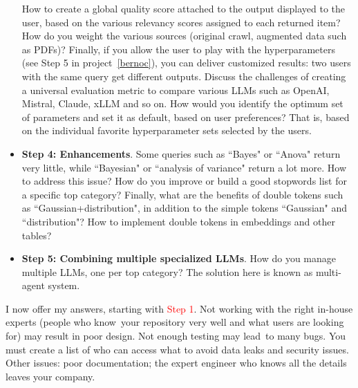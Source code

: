 \documentclass[oneside,10pt]{book}
\begin{document}
\begin{itemize}
How to create a global quality score attached to the output displayed to the user, based on the various relevancy scores assigned to each returned item? How do you weight the various sources (original crawl, augmented data such as PDFs)? Finally, if you allow the user to play with the 
\textcolor{index}{hyperparameters} (see Step 5 
 in project~\ref{bernoc}), you can deliver customized results: two users with the same query get different outputs. Discuss the challenges of creating
 a universal evaluation metric to compare various LLMs such as OpenAI, Mistral, Claude, xLLM and so on. How would you identify the optimum set of parameters and set it as default, based on user preferences? That is, based on the individual favorite hyperparameter sets selected by the users. 
\vspace{1ex}
\item[] {\bf Step 4: Enhancements}.  Some queries such as ``Bayes" or ``Anova" return very little, while ``Bayesian" or ``analysis of variance" return a lot more. How to address this issue? How do you improve or build a good stopwords list for a specific top category? Finally, what are the benefits of double tokens such as ``Gaussian+distribution", in addition to the simple tokens ``Gaussian" and ``distribution"? How to implement double tokens in embeddings and other tables?
\vspace{1ex}
\item[] {\bf Step 5: Combining multiple specialized LLMs}. How do you manage multiple LLMs, one per top category? The solution here is known as 
\textcolor{index}{multi-agent system}. 
\vspace{1ex}
\end{itemize}

\noindent I now offer my answers, starting with \textcolor{red}{Step 1}. Not working with the right in-house experts (people who know~your repository very well and what users are looking for) may result in poor design. Not enough testing may lead~to many bugs. You must create a list of who can access what to avoid data leaks and security issues.
Other issues: poor documentation; the expert engineer who knows all the details leaves your company.  
\end{document}
